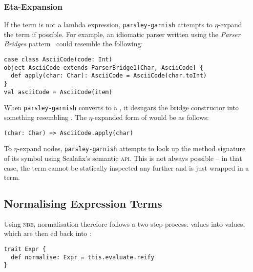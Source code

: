 \documentclass[../../../main.tex]{subfiles}
\begin{document}
\subsubsection{Eta-Expansion}
If the term is not a lambda expression, \texttt{parsley-garnish} attempts to $\eta$-expand the term if possible.
For example, an idiomatic parser written using the \emph{Parser Bridges} pattern~\cite{willis_design_2022} could resemble the following:
\begin{verbatim}
case class AsciiCode(code: Int)
object AsciiCode extends ParserBridge1[Char, AsciiCode] {
  def apply(char: Char): AsciiCode = AsciiCode(char.toInt)
}
val asciiCode = AsciiCode(item)
\end{verbatim}
%
When \texttt{parsley-garnish} converts  to a , it desugars the bridge constructor into something resembling .
The $\eta$-expanded form of  would be as follows:
\begin{verbatim}
(char: Char) => AsciiCode.apply(char)
\end{verbatim}
%
To $\eta$-expand  nodes, \texttt{parsley-garnish} attempts to look up the method signature of its symbol using Scalafix's semantic \textsc{api}.
This is not always possible -- in that case, the term cannot be statically inspected any further and is just wrapped in a  term.

\subsection{Normalising Expression Terms}
Using \textsc{nbe}, normalisation therefore follows a two-step process:  values  into  values, which are then ed back into :
\begin{verbatim}
trait Expr {
  def normalise: Expr = this.evaluate.reify
}
\end{verbatim}
%
\end{document}
